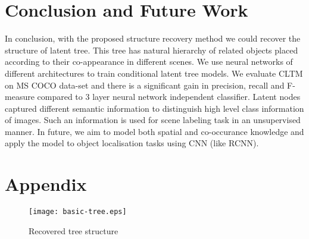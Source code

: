 \documentclass{article}
\begin{document}
\section{Conclusion and Future Work} \label{sec:conclusion}
In conclusion, with the proposed structure recovery method we could recover the structure of latent tree. This tree has natural hierarchy of related objects placed according to their co-appearance in different scenes. We use neural networks of different architectures to train conditional latent tree models. We evaluate CLTM on MS COCO data-set and there is a significant gain in precision, recall and F-measure compared to 3 layer neural network independent classifier. Latent nodes captured different semantic information to distinguish high level class information  of images. Such an information is used for scene labeling task in an unsupervised manner.
In future, we aim to model both spatial and co-occurance knowledge and apply the model to object localisation tasks using CNN (like RCNN).



{\small


}


\section*{Appendix}
\label{appendix}
\begin{figure}[ht]
\begin{center}

\texttt{[image: basic-tree.eps]}

\end{center}

\caption{Recovered tree structure}

\end{figure}
\end{document}
